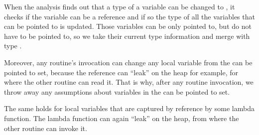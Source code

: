         When the analysis finds out that a type of a variable can 
        be changed to , it checks if the variable can be 
        a reference and if so the type of all the variables that 
        can be pointed to is updated. Those variables can be only 
        pointed to, but do not have to be pointed to, so we take 
        their current type information and merge with type .
        
        Moreover, any routine's invocation can change any local 
        variable from the can be pointed to set, because the 
        reference can ``leak'' on the heap for example, for where 
        the other routine can read it. That is why, after any routine 
        invocation, we throw away any assumptions about variables in 
        the can be pointed to set.
        
        The same holds for local variables that are captured by 
        reference by some lambda function. The lambda function can 
        again ``leak'' on the heap, from where the other routine 
        can invoke it.
        
        
        
